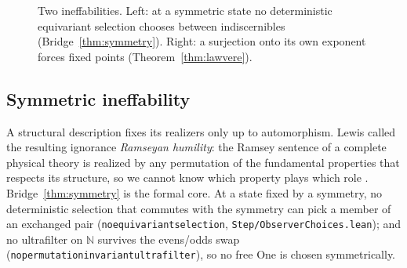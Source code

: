 \documentclass[]{article}
\theoremstyle{definition}
\theoremstyle{remark}
\newcommand{\codeus}{\textunderscore\allowbreak}
\newcommand{\code}[1]{\texttt{\let\_\codeus #1}}
\newcommand{\lpath}[1]{{\ttfamily\nolinkurl{#1}}}
\newcommand{\N}{\mathbb{N}}
\newcommand{\step}[1]{\lpath{Step/#1.lean}}
\begin{document}
\begin{figure}[H]
\centering
{}
\caption{Two ineffabilities. Left: at a symmetric state no deterministic equivariant selection
chooses between indiscernibles (Bridge~\ref{thm:symmetry}). Right: a surjection onto its own exponent forces fixed points
(Theorem~\ref{thm:lawvere}).}
\label{fig:twoineffable}
\end{figure}

\subsection{Symmetric ineffability}
\label{sec:symmetric}

A structural description fixes its realizers only up to automorphism. Lewis called the resulting
ignorance \emph{Ramseyan humility}: the Ramsey sentence of a complete physical theory is realized by
any permutation of the fundamental properties that respects its structure, so we cannot know which
property plays which role \cite{Lewis2009}. Bridge~\ref{thm:symmetry} is the formal core. At a state
fixed by a symmetry, no deterministic selection that commutes with the symmetry can pick a member of
an exchanged pair (\code{no\_equivariant\_selection}, \step{ObserverChoices}); and no ultrafilter on $\N$
survives the evens/odds swap (\code{no\_permutation\_invariant\_ultrafilter}), so no free One is chosen
symmetrically.
\end{document}
